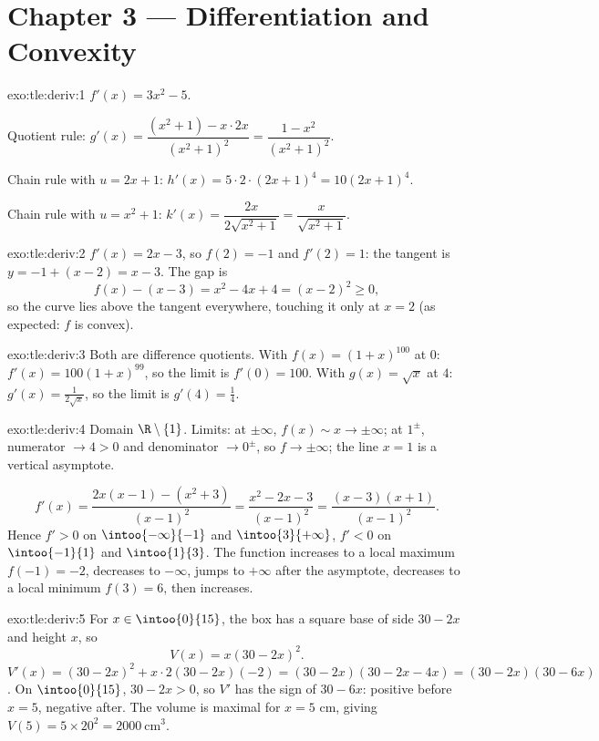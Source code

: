 \section*{Chapter 3 --- Differentiation and Convexity}

\begin{solution}{exo:tle:deriv:1}
$f'(x) = 3x^2 - 5$.

Quotient rule:
$g'(x) = \dfrac{(x^2+1) - x\cdot 2x}{(x^2+1)^2} = \dfrac{1 - x^2}{(x^2+1)^2}$.

Chain rule with $u = 2x+1$: $h'(x) = 5 \cdot 2 \cdot (2x+1)^4 = 10(2x+1)^4$.

Chain rule with $u = x^2 + 1$:
$k'(x) = \dfrac{2x}{2\sqrt{x^2+1}} = \dfrac{x}{\sqrt{x^2+1}}$.
\end{solution}

\begin{solution}{exo:tle:deriv:2}
$f'(x) = 2x - 3$, so $f(2) = -1$ and $f'(2) = 1$: the tangent is
$y = -1 + (x - 2) = x - 3$. The gap is
\[
f(x) - (x - 3) = x^2 - 4x + 4 = (x-2)^2 \geq 0 ,
\]
so the curve lies above the tangent everywhere, touching it only at $x = 2$
(as expected: $f$ is convex).
\end{solution}

\begin{solution}{exo:tle:deriv:3}
Both are difference quotients. With $f(x) = (1+x)^{100}$ at $0$:
$f'(x) = 100(1+x)^{99}$, so the limit is $f'(0) = 100$.
With $g(x) = \sqrt{x}$ at $4$: $g'(x) = \frac{1}{2\sqrt{x}}$, so the limit is
$g'(4) = \frac14$.
\end{solution}

\begin{solution}{exo:tle:deriv:4}
Domain $\R \setminus \{1\}$. Limits: at $\pm\infty$, $f(x) \sim x \to
\pm\infty$; at $1^\pm$, numerator $\to 4 > 0$ and denominator $\to 0^\pm$,
so $f \to \pm\infty$; the line $x = 1$ is a vertical asymptote.

\[
f'(x) = \frac{2x(x-1) - (x^2+3)}{(x-1)^2} = \frac{x^2 - 2x - 3}{(x-1)^2}
= \frac{(x-3)(x+1)}{(x-1)^2}.
\]
Hence $f' > 0$ on $\intoo{-\infty}{-1}$ and $\intoo{3}{+\infty}$, $f' < 0$ on
$\intoo{-1}{1}$ and $\intoo{1}{3}$. The function increases to a local maximum
$f(-1) = -2$, decreases to $-\infty$, jumps to $+\infty$ after the asymptote,
decreases to a local minimum $f(3) = 6$, then increases.
\end{solution}

\begin{solution}{exo:tle:deriv:5}
For $x \in \intoo{0}{15}$, the box has a square base of side $30 - 2x$ and
height $x$, so
\[
V(x) = x(30 - 2x)^2 .
\]
$V'(x) = (30-2x)^2 + x \cdot 2(30-2x)(-2) = (30-2x)(30 - 2x - 4x)
= (30-2x)(30-6x)$. On $\intoo{0}{15}$, $30 - 2x > 0$, so $V'$ has the sign of
$30 - 6x$: positive before $x = 5$, negative after. The volume is maximal for
$x = 5$ cm, giving $V(5) = 5 \times 20^2 = 2000\ \text{cm}^3$.
\end{solution}

